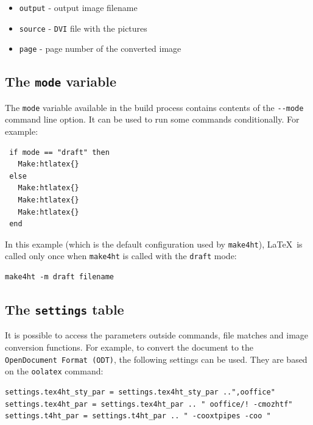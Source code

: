 \begin{itemize}
\tightlist
\item
  \texttt{output} - output image filename
\item
  \texttt{source} - \texttt{DVI} file with the pictures
\item
  \texttt{page} - page number of the converted image
\end{itemize}

\subsection{\texorpdfstring{The \texttt{mode}
variable}{The mode variable}}\label{the-mode-variable}

The \texttt{mode} variable available in the build process contains
contents of the \texttt{-\/-mode} command line option. It can be used to
run some commands conditionally. For example:

\begin{verbatim}
 if mode == "draft" then
   Make:htlatex{} 
 else
   Make:htlatex{}
   Make:htlatex{}
   Make:htlatex{}
 end
\end{verbatim}

In this example (which is the default configuration used by
\texttt{make4ht}), \LaTeX~is called only once when \texttt{make4ht} is
called with the \texttt{draft} mode:

\begin{verbatim}
make4ht -m draft filename
\end{verbatim}

\subsection{\texorpdfstring{The \texttt{settings}
table}{The settings table}}\label{the-settings-table}

\label{sec:settings}

It is possible to access the parameters outside commands, file matches
and image conversion functions. For example, to convert the document to
the \texttt{OpenDocument\ Format\ (ODT)}, the following settings can be
used. They are based on the \texttt{oolatex} command:

\begin{verbatim}
settings.tex4ht_sty_par = settings.tex4ht_sty_par ..",ooffice"
settings.tex4ht_par = settings.tex4ht_par .. " ooffice/! -cmozhtf"
settings.t4ht_par = settings.t4ht_par .. " -cooxtpipes -coo "
\end{verbatim}

